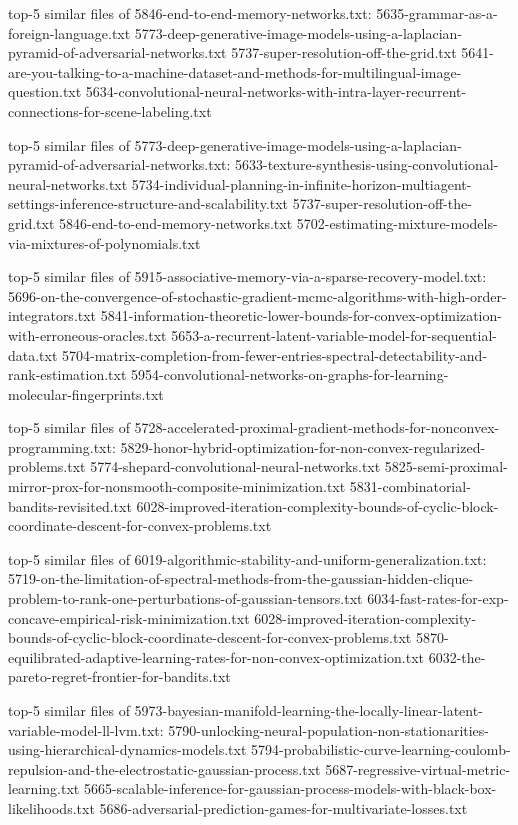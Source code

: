 \documentclass[11pt]{article}
\begin{document}
top-5 similar files of 5846-end-to-end-memory-networks.txt:
5635-grammar-as-a-foreign-language.txt
5773-deep-generative-image-models-using-a-laplacian-pyramid-of-adversarial-networks.txt
5737-super-resolution-off-the-grid.txt
5641-are-you-talking-to-a-machine-dataset-and-methods-for-multilingual-image-question.txt
5634-convolutional-neural-networks-with-intra-layer-recurrent-connections-for-scene-labeling.txt

top-5 similar files of
5773-deep-generative-image-models-using-a-laplacian-pyramid-of-adversarial-networks.txt:
5633-texture-synthesis-using-convolutional-neural-networks.txt
5734-individual-planning-in-infinite-horizon-multiagent-settings-inference-structure-and-scalability.txt
5737-super-resolution-off-the-grid.txt
5846-end-to-end-memory-networks.txt
5702-estimating-mixture-models-via-mixtures-of-polynomials.txt

top-5 similar files of
5915-associative-memory-via-a-sparse-recovery-model.txt:
5696-on-the-convergence-of-stochastic-gradient-mcmc-algorithms-with-high-order-integrators.txt
5841-information-theoretic-lower-bounds-for-convex-optimization-with-erroneous-oracles.txt
5653-a-recurrent-latent-variable-model-for-sequential-data.txt
5704-matrix-completion-from-fewer-entries-spectral-detectability-and-rank-estimation.txt
5954-convolutional-networks-on-graphs-for-learning-molecular-fingerprints.txt

top-5 similar files of
5728-accelerated-proximal-gradient-methods-for-nonconvex-programming.txt:
5829-honor-hybrid-optimization-for-non-convex-regularized-problems.txt
5774-shepard-convolutional-neural-networks.txt
5825-semi-proximal-mirror-prox-for-nonsmooth-composite-minimization.txt
5831-combinatorial-bandits-revisited.txt
6028-improved-iteration-complexity-bounds-of-cyclic-block-coordinate-descent-for-convex-problems.txt

top-5 similar files of
6019-algorithmic-stability-and-uniform-generalization.txt:
5719-on-the-limitation-of-spectral-methods-from-the-gaussian-hidden-clique-problem-to-rank-one-perturbations-of-gaussian-tensors.txt
6034-fast-rates-for-exp-concave-empirical-risk-minimization.txt
6028-improved-iteration-complexity-bounds-of-cyclic-block-coordinate-descent-for-convex-problems.txt
5870-equilibrated-adaptive-learning-rates-for-non-convex-optimization.txt
6032-the-pareto-regret-frontier-for-bandits.txt

top-5 similar files of
5973-bayesian-manifold-learning-the-locally-linear-latent-variable-model-ll-lvm.txt:
5790-unlocking-neural-population-non-stationarities-using-hierarchical-dynamics-models.txt
5794-probabilistic-curve-learning-coulomb-repulsion-and-the-electrostatic-gaussian-process.txt
5687-regressive-virtual-metric-learning.txt
5665-scalable-inference-for-gaussian-process-models-with-black-box-likelihoods.txt
5686-adversarial-prediction-games-for-multivariate-losses.txt
\end{document}
